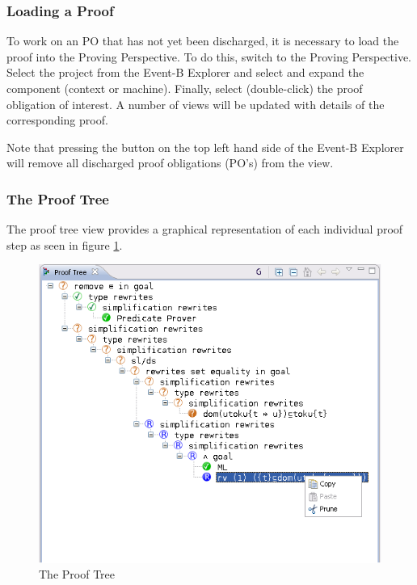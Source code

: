 
\subsubsection{Loading a Proof}

To work on an PO that has not yet been discharged, it is necessary to load the proof into the Proving Perspective. To do this, switch to the Proving Perspective. Select the project from the Event-B Explorer and select and expand the component (context or machine). Finally, select (double-click) the proof obligation of interest. A number of views will be updated with details of the corresponding proof. 

Note that pressing the  button on the top left hand side of the \textsf{Event-B Explorer} will remove all discharged proof obligations (PO's) from the view. 

\subsubsection{The Proof Tree}
\label{proof_tree_view}

The proof tree view provides a graphical representation of each individual proof step as seen in figure \ref{fig_ref_01_proving_perspective2}.

\begin{figure}[!ht]
\begin{center}
	\includegraphics{img/reference/ref_01_proving_perspective2.png}
	\caption{The Proof Tree}
	\label{fig_ref_01_proving_perspective2}
\end{center}
\end{figure}

